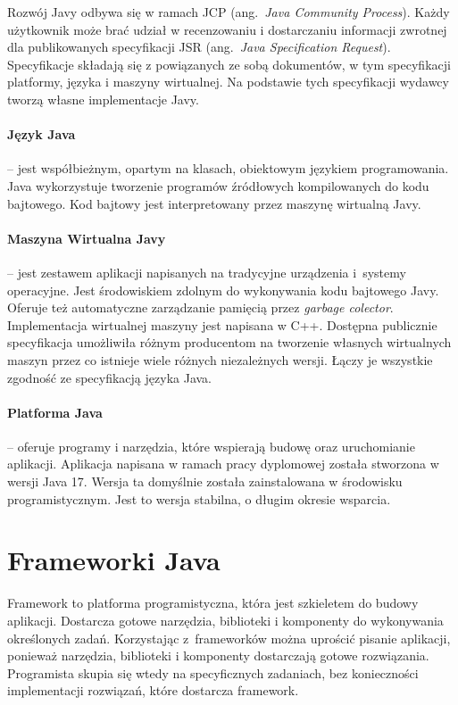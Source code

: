 Rozwój Javy odbywa się w ramach JCP (ang.~\emph{Java Community Process}). Każdy użytkownik może brać udział w recenzowaniu i dostarczaniu informacji zwrotnej dla publikowanych specyfikacji JSR (ang.~\emph{Java Specification Request}). Specyfikacje składają się z powiązanych ze sobą dokumentów, w tym specyfikacji platformy, języka i  maszyny wirtualnej. Na podstawie tych specyfikacji wydawcy tworzą własne implementacje Javy.

\paragraph{Język Java} -- jest współbieżnym, opartym na klasach, obiektowym językiem programowania. Java wykorzystuje tworzenie programów źródłowych kompilowanych do kodu bajtowego. Kod bajtowy jest interpretowany przez maszynę wirtualną Javy. 

\paragraph{Maszyna Wirtualna Javy} -- jest zestawem aplikacji napisanych na tradycyjne urządzenia i~systemy operacyjne. Jest środowiskiem  zdolnym do wykonywania kodu bajtowego Javy. Oferuje też automatyczne zarządzanie pamięcią przez \emph{garbage colector}. Implementacja wirtualnej maszyny jest napisana w C++. Dostępna publicznie specyfikacja umożliwiła różnym producentom na tworzenie własnych wirtualnych maszyn przez co istnieje wiele różnych niezależnych wersji. Łączy je wszystkie zgodność ze specyfikacją języka Java.

\paragraph{Platforma Java} -- oferuje programy i narzędzia, które wspierają budowę oraz uruchomianie aplikacji. Aplikacja napisana w ramach pracy dyplomowej została stworzona w wersji Java 17. Wersja ta domyślnie została zainstalowana w środowisku programistycznym. Jest to wersja stabilna, o długim okresie wsparcia.

\section{Frameworki Java}
Framework to platforma programistyczna, która jest szkieletem do budowy aplikacji. Dostarcza gotowe narzędzia, biblioteki i komponenty do wykonywania określonych zadań. Korzystając z~frameworków można uprościć pisanie aplikacji, ponieważ narzędzia, biblioteki i komponenty dostarczają gotowe rozwiązania. Programista skupia się wtedy na specyficznych zadaniach, bez konieczności implementacji rozwiązań, które dostarcza framework. 

